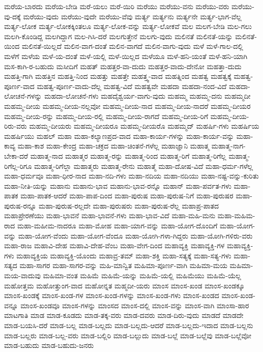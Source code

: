 {ಮರೆಯ-ಬಾರದು
ಮರೆಯ-ಬೇಡಿ
ಮರೆ-ಯಲು
ಮರೆ-ಯಿರಿ
ಮರೆಯು
ಮರೆಯು-ವನು
ಮರೆಯು-ವರು
ಮರೆಯು-ವು-ದಕ್ಕೆ
ಮರೆಯು-ವುದು
ಮರೆಯು-ವುದೇ
ಮರೆಯು-ವೆವು
ಮರ್ತ್ಯ
ಮರ್ತ್ಯನು
ಮರ್ತ್ಯನೇ
ಮರ್ತ್ಯ-ಭಾಗ-ವೆಲ್ಲ
ಮರ್ತ್ಯ-ಲೋಕ
ಮರ್ತ್ಯ-ಲೋಕಕ್ಕಿಂತಲೂ
ಮರ್ತ್ಯ-ಲೋಕ-ವನ್ನು
ಮರ್ತ್ಯ-ಲೋಕವೆ
ಮಲ
ಮಲಗ-ಬೇಡಿ
ಮಲ-ಗಲು
ಮಲಗಿ-ಕೊಂಡಿದ್ದ
ಮಲಗಿದ್ದಾಗ
ಮಲ-ಗಿಸಿ-ದರೆ
ಮಲಗುತ್ತೇನೆ
ಮಲಗು-ವುದು
ಮಲಿನತೆ
ಮಲಿನತೆ-ಯನ್ನು
ಮಲಿನತೆ-ಯಿಂದ
ಮಲಿನತೆ-ಯಿಲ್ಲದೆ
ಮಲಿನ-ವಾಗ-ದಂತೆ
ಮಲಿನ-ವಾಗದೆ
ಮಲಿನ-ವಾಗು-ವುದು
ಮಳೆ
ಮಳೆ-ಗಾಲ-ದಲ್ಲಿ
ಮಳೆಗೆ
ಮಳೆಯ
ಮಳೆ-ಯ-ದಂತೆ
ಮಳೆ-ಯಲ್ಲಿ
ಮಳೆ-ಯಿಲ್ಲದ
ಮಳೆಯೂ
ಮಳೆ-ಹನಿ-ಯಂತೆ
ಮಳೆ-ಹನಿ-ಯಾಗಿ
ಮಸ-ಕಾಗಿ-ರ-ಬಹುದು
ಮಸೀದಿಗೆ
ಮಹತ್
ಮಹತ್ತರ-ವಾ-ದುದು
ಮಹತ್ತರ-ವಾದು-ದೇನೋ
ಮಹತ್ತಾ-ದುದು
ಮಹತ್ತಿ-ಗಾಗಿ
ಮಹತ್ತಿನ
ಮಹತ್ತಿ-ನಿಂದ
ಮಹತ್ತು
ಮಹತ್ತೇ
ಮಹತ್ತ್ವ-ವಾದ
ಮಹತ್ನಿಂದ
ಮಹತ್ವ
ಮಹತ್ವಕ್ಕೆ
ಮಹತ್ವ-ಪೂರ್ಣ-ವಾದ
ಮಹತ್ವ-ಪೂರ್ಣ-ವಾದು-ದೆಲ್ಲ
ಮಹತ್ವ-ವಿದೆ
ಮಹತ್ವವೇ
ಮಹದಾ
ಮಹದಾ-ನಂದ-ವಿದೆ
ಮಹದಾ-ಲೋಚನೆ-ಗಳನ್ನು
ಮಹದಾ-ಲೋಚನೆ-ಗಳು
ಮಹದೈಶ್ವರ್ಯ-ವಾಗು-ವುದು
ಮಹಮ್ಮ
ಮಹಮ್ಮ-ದನು
ಮಹಮ್ಮದೀ
ಮಹಮ್ಮ-ದೀಯ
ಮಹಮ್ಮ-ದೀಯ-ನಲ್ಲವೋ
ಮಹಮ್ಮ-ದೀಯ-ನಾದ
ಮಹಮ್ಮ-ದೀಯ-ನಾದರೆ
ಮಹಮ್ಮ-ದೀಯರ
ಮಹಮ್ಮ-ದೀಯ-ರನ್ನು
ಮಹಮ್ಮ-ದೀಯ-ರಲ್ಲಿ
ಮಹಮ್ಮ-ದೀಯ-ರಾಗದೆ
ಮಹಮ್ಮ-ದೀಯ-ರಿಗೆ
ಮಹಮ್ಮ-ದೀಯ-ರಿರು-ವರು
ಮಹಮ್ಮ-ದೀಯರು
ಮಹಮ್ಮ-ದೀಯರೂ
ಮಹಮ್ಮ-ದೀಯರೊ
ಮಹಮ್ಮದ್
ಮಹರ್ಷಿ-ಗಳು
ಮಹರ್ಷಿಯ
ಮಹರ್ಷಿಯು
ಮಹಲ್
ಮಹಾ
ಮಹಾ-ಕಲ್ಯಾಣಪ್ರದ-ವಾದ
ಮಹಾ-ಕಾರ್ಯ-ಗಳನ್ನು
ಮಹಾ-ಕಾರ್ಯ-ವನ್ನು
ಮಹಾ-ಕಾವ್ಯ
ಮಹಾ-ಕಾಶ
ಮಹಾ-ಕೇಂದ್ರ
ಮಹಾ-ಚಕ್ರದ
ಮಹಾ-ಚಿಂತನೆ-ಗಳೆಲ್ಲ
ಮಹಾಜ್ಞಾನಿ
ಮಹಾತ್ಮ
ಮಹಾತ್ಮ-ನಾಗ-ಬೇಕಾ-ದರೆ
ಮಹಾತ್ಮ-ನಾದ
ಮಹಾತ್ಮರ
ಮಹಾತ್ಮ-ರನ್ನು
ಮಹಾತ್ಮ-ರಿಂದ
ಮಹಾತ್ಮ-ರಿಗೆ
ಮಹಾತ್ಮ-ರಿಗೆಲ್ಲ
ಮಹಾತ್ಮ-ರಿಗೆಲ್ಲ-ರಿಗೂ
ಮಹಾತ್ಮ-ರಿಗೆಲ್ಲಾ
ಮಹಾತ್ಮರು
ಮಹಾತ್ಮ-ರೇನು
ಮಹಾತ್ಮೆ
ಮಹಾ-ದೋಷ-ವಿದೆ
ಮಹಾ-ಧರ್ಮ-ಗಳೆಲ್ಲ
ಮಹಾ-ಧರ್ಮವೂ
ಮಹಾ-ಧೀರ-ನಾದ
ಮಹಾ-ನದಿ-ಗಳು
ಮಹಾ-ನದಿಯ
ಮಹಾ-ನದಿಯು
ಮಹಾ-ನಷ್ಟ-ವನ್ನು-ಕುರಿತು
ಮಹಾ-ನೀತಿ-ಯನ್ನು
ಮಹಾನು
ಮಹಾನು-ಭಾವ
ಮಹಾನು-ಭಾವ-ರನ್ನೊ
ಮಹಾನ್
ಮಹಾ-ಪರ್ವತ-ಗಳು
ಮಹಾ-ಪಾತಕ
ಮಹಾ-ಪಾತಕ-ಆದರೆ
ಮಹಾ-ಪಾಪ-ದಿಂದ
ಮಹಾ-ಪುರುಷ
ಮಹಾ-ಪುರುಷ-ನಿಗೆ
ಮಹಾ-ಪುರುಷರ
ಮಹಾ-ಪುರುಷ-ರನ್ನೂ
ಮಹಾ-ಪುರುಷ-ರಲ್ಲದೇ
ಮಹಾ-ಪುರುಷರು
ಮಹಾ-ಪುರುಷ-ರೆಲ್ಲ
ಮಹಾಪ್ರ-ಪಾತದ
ಮಹಾಪ್ರೇರಣೆಯು
ಮಹಾ-ಭಾವನೆ
ಮಹಾ-ಭಾವನೆ-ಗಳು
ಮಹಾ-ಭಾವ-ವಿದೆ
ಮಹಾ-ಮಹಿ-ಮನು
ಮಹಾ-ಮಹಿಮ-ರಾದ
ಮಹಾ-ಮಹೀಮ-ನಾದರೂ
ಮಹಾ-ಮೋಹ
ಮಹಾ-ಯಾಗ-ವನ್ನು
ಮಹಾ-ಯೋಗ-ದೊಂದಿಗೆ
ಮಹಾ-ಯೋಗ-ವನ್ನು
ಮಹಾ-ಯೋಗ-ವೆಂದು
ಮಹಾ-ಯೋಗ-ವೆಂದೂ
ಮಹಾ-ಯೋಗಿ-ಗಳಾ-ಗಿದ್ದರು
ಮಹಾ-ಯೋಗಿ-ಗಳಿರು-ವರು
ಮಹಾ-ರಾಜ
ಮಹಾವಿ-ದೇಹ
ಮಹಾವಿ-ದೇಹ-ವೆಂಬ
ಮಹಾ-ವೇಗ-ದಿಂದ
ಮಹಾವ್ಯಕ್ತಿ
ಮಹಾವ್ಯಕ್ತಿ-ಗಳ
ಮಹಾವ್ಯಕ್ತಿ-ಗಳು
ಮಹಾವ್ಯಕ್ತಿಯ
ಮಹಾವ್ಯಕ್ತಿ-ಯೊಂದು
ಮಹಾವ್ರ-ತಮ್
ಮಹಾ-ಶಕ್ತಿ
ಮಹಾ-ಸತ್ಯಕ್ಕೆ
ಮಹಾ-ಸತ್ಯ-ಗಳು
ಮಹಾ-ಸತ್ಯದ
ಮಹಾ-ಸಾಗರ
ಮಹಾ-ಸಾಗರ-ವನ್ನು
ಮಹಿ-ಮಾನ್ವಿತ
ಮಹಿಮಾ-ಪೂರ್ಣ-ವಾಗಿ
ಮಹಿಮಾ-ಮಯ
ಮಹಿಮಾ-ಮಯ-ವಾದುವು
ಮಹಿಮಾ-ವಂತ
ಮಹಿಮೆ
ಮಹಿಮೆ-ಯನ್ನು
ಮಹಿಮೆ-ಯಲ್ಲಿ
ಮಹಿಮೆಯು
ಮಹಿಮೆ-ಯೆಲ್ಲ
ಮಹೋತ್ತಮ
ಮಹೋತ್ತುಂಗ-ವಾದ
ಮಹೋನ್ನತ
ಮಹ್ಮದೀ-ಯರು
ಮಾಂಸ
ಮಾಂಸ-ಖಂಡ
ಮಾಂಸ-ಖಂಡಕ್ಕೂ
ಮಾಂಸ-ಖಂಡಕ್ಕೆ
ಮಾಂಸ-ಖಂಡ-ಗಳ
ಮಾಂಸ-ಖಂಡ-ಗಳನ್ನು
ಮಾಂಸ-ಖಂಡ-ಗಳು
ಮಾಂಸ-ಖಂಡದ
ಮಾಂಸ-ಖಂಡ-ವನ್ನೂ
ಮಾಂಸ-ಖಂಡವೂ
ಮಾಂಸ-ಗಳನ್ನು
ಮಾಂಸದ
ಮಾಂಸ-ದಲ್ಲಿ
ಮಾಂಸ-ವನ್ನು
ಮಾಂಸ-ವಾಗಿ
ಮಾಂಸಾ-ಹಾರ
ಮಾಟಗಾತಿ
ಮಾಡ
ಮಾಡ-ಕೂಡದು
ಮಾಡ-ತಕ್ಕ-ವರು
ಮಾಡ-ದವರು
ಮಾಡ-ದಿರು-ವುದು
ಮಾಡದೆ
ಮಾಡದೇ
ಮಾಡ-ಬಯಸಿ-ದರೆ
ಮಾಡ-ಬಲ್ಲ
ಮಾಡ-ಬಲ್ಲದು
ಮಾಡ-ಬಲ್ಲದು-ಆದರೆ
ಮಾಡ-ಬಲ್ಲದು-ಇದಾದ
ಮಾಡ-ಬಲ್ಲನು
ಮಾಡ-ಬಲ್ಲರು
ಮಾಡ-ಬಲ್ಲ-ವರು
ಮಾಡ-ಬಲ್ಲಿರಿ
ಮಾಡ-ಬಲ್ಲುದು
ಮಾಡ-ಬಲ್ಲೆ
ಮಾಡ-ಬಲ್ಲೆವು
ಮಾಡ-ಬಲ್ಲೆವೋ
ಮಾಡ-ಬಹುದು
ಮಾಡ-ಬಹುದು-ಜನರು
}
